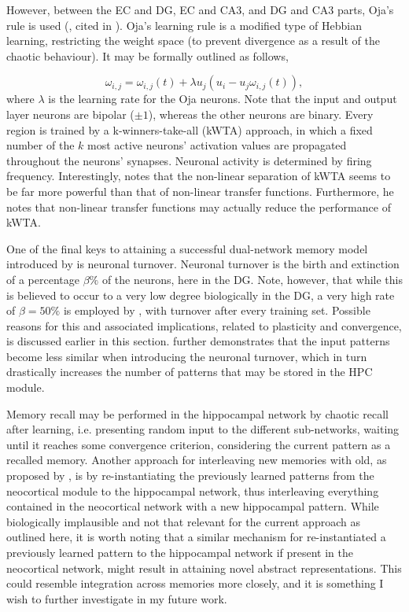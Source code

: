 However, between the EC and DG, EC and CA3, and DG and CA3 parts, Oja's rule is used (\cite{Hertz1991}, cited in \cite{Hattori2014}). Oja's learning rule is a modified type of Hebbian learning, restricting the weight space (to prevent divergence as a result of the chaotic behaviour). It may be formally outlined as follows,

\begin{equation}\label{ojas_rule}
    \omega_{i,j} = \omega_{i,j}(t) + \lambda u_j (u_i - u_j \omega_{i,j}(t)),
\end{equation}
where $\lambda$ is the learning rate for the Oja neurons. Note that the input and output layer neurons are bipolar ($\pm 1$), whereas the other neurons are binary. Every region is trained by a k-winners-take-all (kWTA) approach, in which a fixed number of the $k$ most active neurons' activation values are propagated throughout the neurons' synapses. Neuronal activity is determined by firing frequency. Interestingly, \citep{Hattori2014} notes that the non-linear separation of kWTA seems to be far more powerful than that of non-linear transfer functions. Furthermore, he notes that non-linear transfer functions may actually reduce the performance of kWTA.

One of the final keys to attaining a successful dual-network memory model introduced by \cite{Hattori2014} is neuronal turnover. Neuronal turnover is the birth and extinction of a percentage $\beta \%$ of the neurons, here in the DG. Note, however, that while this is believed to occur to a very low degree biologically in the DG, a very high rate of $\beta = 50 \%$ is employed by \cite{Hattori2014}, with turnover after every training set. Possible reasons for this and associated implications, related to plasticity and convergence, is discussed earlier in this section. \cite{Hattori2014} further demonstrates that the input patterns become less similar when introducing the neuronal turnover, which in turn drastically increases the number of patterns that may be stored in the HPC module.

Memory recall may be performed in the hippocampal network by chaotic recall after learning, i.e. presenting random input to the different sub-networks, waiting until it reaches some convergence criterion, considering the current pattern as a recalled memory. Another approach for interleaving new memories with old, as proposed by \cite{French1997}, is by re-instantiating the previously learned patterns from the neocortical module to the hippocampal network, thus interleaving everything contained in the neocortical network with a new hippocampal pattern. While biologically implausible and not that relevant for the current approach as outlined here, it is worth noting that a similar mechanism for re-instantiated a previously learned pattern to the hippocampal network if present in the neocortical network, might result in attaining novel abstract representations. This could resemble integration across memories more closely, and it is something I wish to further investigate in my future work.


